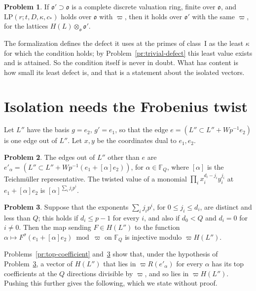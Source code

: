 \documentclass[reqno]{amsart}
\theoremstyle{definition}
\newtheorem{problem}{Problem}[section]
\theoremstyle{plain}
\theoremstyle{remark}
\newcommand{\F}{\mathbb F}
\newcommand{\LP}{\mathrm{LP}}
\newcommand{\vo}{\mathfrak o}
\begin{document}
\begin{problem}\label{pr:base-change}
If \(\vo'\supset\vo\) is a complete discrete valuation ring, finite over \(\vo\), and \(\LP(r;t,D,\kappa,c_*)\) holds over \(\vo\) with \(\varpi\), then it holds over \(\vo'\) with the same \(\varpi\), for the lattices \(H(L)\otimes_\vo\vo'\).
\end{problem}

The formalization defines the defect it uses at the primes of class~I as the least \(\kappa\) for which the condition holds; by Problem~\ref{pr:trivial-defect} this least value exists and is attained.  So the condition itself is never in doubt.  What has content is how small its least defect is, and that is a statement about the isolated vectors.

\section{Isolation needs the Frobenius twist}\label{sec:isolation}

Let \(L''\) have the basis \(g=e_2\), \(g'=e_1\), so that the edge \(e=(L''\subset L''+Wp^{-1}e_2)\) is one edge out of \(L''\).  Let \(x,y\) be the coordinates dual to \(e_1,e_2\).

\begin{problem}\label{pr:other-edges}
The edges out of \(L''\) other than \(e\) are \(e'_\alpha=(L''\subset L''+Wp^{-1}(e_1+[\alpha]e_2))\), for \(\alpha\in\F_Q\), where \([\alpha]\) is the Teichm\"uller representative.  The twisted value of a monomial \(\prod_ix_i^{d_i-j_i}y_i^{j_i}\) at \(e_1+[\alpha]e_2\) is \([\alpha]^{\sum_ij_ip^i}\).
\end{problem}

\begin{problem}\label{pr:digits}
Suppose that the exponents \(\sum_ij_ip^i\), for \(0\le j_i\le d_i\), are distinct and less than \(Q\); this holds if \(d_i\le p-1\) for every \(i\), and also if \(d_0<Q\) and \(d_i=0\) for \(i\ne0\).  Then the map sending \(F\in H(L'')\) to the function \(\alpha\mapsto F^\sigma(e_1+[\alpha]e_2)\bmod\varpi\) on \(\F_Q\) is injective modulo \(\varpi H(L'')\).
\end{problem}

Problems~\ref{pr:top-coefficient} and~\ref{pr:digits} show that, under the hypothesis of Problem~\ref{pr:digits}, a vector of \(H(L'')\) that lies in \(\varpi R(e'_\alpha)\) for every \(\alpha\) has its top coefficients at the \(Q\) directions divisible by \(\varpi\), and so lies in \(\varpi H(L'')\).  Pushing this further gives the following, which we state without proof.
\end{document}
